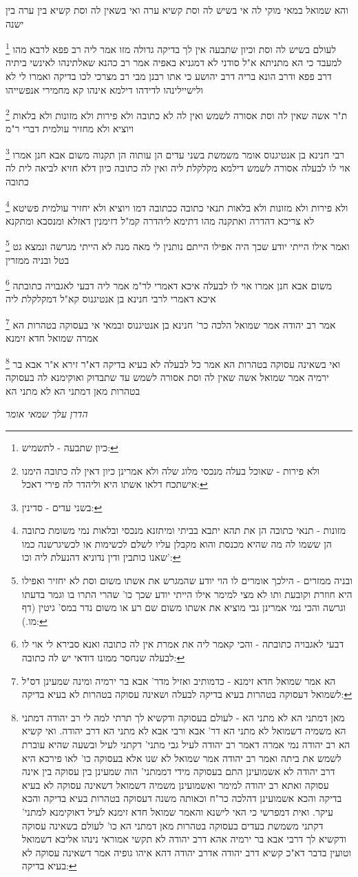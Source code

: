 \documentclass[12pt, openany]{book}
\newcommand{\footnotecomment}[1]{
	\renewcommand\thefootnote{}
	\footnote{#1}}
\newcommand{\commenta}[1]{\footnotecomment{#1}}
\begin{document}
{{והא שמואל במאי מוקי לה אי בשיש לה וסת קשיא ערה ואי בשאין לה וסת קשיא בין ערה בין ישנה 
\commenta{כיון שתבעה - לתשמיש:}
לעולם בשיש לה וסת וכיון שתבעה אין לך בדיקה גדולה מזו אמר ליה רב פפא לרבא מהו למעבד כי הא מתניתא
א"ל סודני לא דמגניא באפיה אמר רב כהנא שאלתינהו לאינשי ביתיה דרב פפא ודרב הונא בריה דרב יהושע כי אתו רבנן מבי רב מצרכי לכו בדיקה ואמרו לי לא ולישיילינהו לדידהו דילמא אינהו קא מחמירי אנפשייהו 
\commenta{ולא פירות - שאוכל בעלה מנכסי מלוג שלה ולא אמרינן כיון דאין לה כתובה הימנו אישתכח דלאו אשתו היא וליהדר לה פירי דאכל:}
ת"ר אשה שאין לה וסת אסורה לשמש ואין לה לא כתובה ולא פירות ולא מזונות ולא בלאות ויוציא ולא מחזיר עולמית דברי ר"מ 
\commenta{בשני עדים - סדינין:}
רבי חנינא בן אנטיגנוס אומר משמשת בשני עדים הן עותוה הן תקנוה משום אבא חנן אמרו אוי לו לבעלה 
אסורה לשמש דילמא מקלקלת ליה ואין לה כתובה כיון דלא חזיא לביאה לית לה כתובה
\commenta{מזונות - תנאי כתובה הן את תהא יתבא בביתי ומיתזנא מנכסי ובלאות נמי משומת כתובה הן ששמו לה מה שהיא מכנסת והוא מקבלן עליו לשלם לכשימות או לכשיגרשנה כמו שאנו כותבין ודין נדוניא דהנעלת ליה וכו':}
ולא פירות ולא מזונות ולא בלאות תנאי כתובה ככתובה דמו 
ויוציא ולא יחזיר עולמית פשיטא לא צריכא דהדרה ואתקנה מהו דתימא ליהדרה קמ"ל דזימנין דאזלא ומנסבא ומתקנא
\commenta{ובניה ממזרים - הילכך אומרים לו הוי יודע שהמגרש את אשתו משום וסת לא יחזיר ואפילו היא חוזרת וקובעת ותו לא מצי למימר אילו הייתי יודע שכך כו' שהרי התרו בו וגמר בדעתו וגרשה והכי נמי אמרינן גבי מוציא את אשתו משום שם רע או משום נדר במס' גיטין (דף מו.):}
ואמר אילו הייתי יודע שכך היה אפילו הייתם נותנין לי מאה מנה לא הייתי מגרשה ונמצא גט בטל ובניה ממזרין 
\commenta{דבעי לאגבויה כתובתה - והכי קאמר ליה את אמרת אין לה כתובה ואנא סבירא לי אוי לו לבעלה שנחסר ממונו דודאי יש לה כתובה:}
משום אבא חנן אמרו אוי לו לבעלה איכא דאמרי לר"מ אמר ליה דבעי לאגבויה כתובתה איכא דאמרי לרבי חנינא בן אנטיגנוס קא"ל דמקלקלת ליה 
\commenta{הא אמר שמואל חדא זימנא - כדמותיב ואזיל מדר' אבא בר ירמיה ומינה שמעינן דס"ל לשמואל דעסוקה בטהרות בעיא בדיקה לבעלה ושאינה עסוקה בטהרות לא בעיא בדיקה:}
אמר רב יהודה אמר שמואל הלכה כר' חנינא בן אנטיגנוס ובמאי אי בעסוקה בטהרות הא אמרה שמואל חדא זימנא 
\commenta{מאן דמתני הא לא מתני הא - לעולם בעסוקה ודקשיא לך תרתי למה לי רב יהודה דמתני הא משמיה דשמואל לא מתני הא דר' אבא ורבי אבא לא מתני הא דרב יהודה. ואי קשיא הא רב יהודה נמי אמרה דאמר רב יהודה לעיל גבי מתני' דקתני לעיל ובשעה שהיא עוברת לשמש את ביתה ואמר רב יהודה אמר שמואל לא שנו אלא בעסוקה כו' לאו פירכא היא דרב יהודה לא אשמועינן התם בעסוקה מידי דממתני' הוה שמעינן בין עסוקה בין אינה עסוקה ואתא רב יהודה למימר ואשמועינן משמיה דשמואל דשאינה עסוקה לא בעיא בדיקה והכא אשמועינן דהלכה כר"ח וכאותה משנה דעסוקה בטהרות בעיא בדיקה והכא עיקר. ואית דמפרשי כי האי לישנא והאמר שמואל חדא זימנא לעיל דאוקימנא למתני' דקתני משמשת בעדים בעסוקה בטהרות מאן דמתני הא כו' לעולם בשאינה עסוקה ודקשיא לך דרבי אבא בר ירמיה אהא דרב יהודה לא תקשי אמוראי נינהו אליבא דשמואל וטועין בדבר דא"כ קשיא דרב יהודה אדרב יהודה דהא איהו גופיה אמר דשאינה עסוקה לא בעיא בדיקה: }
ואי בשאינה עסוקה בטהרות הא אמר כל לבעלה לא בעיא בדיקה דא"ר זירא א"ר אבא בר ירמיה אמר שמואל אשה שאין לה וסת אסורה לשמש עד שתבדוק ואוקימנא לה בעסוקה בטהרות מאן דמתני הא לא מתני הא
\par \par {\large\emph{הדרן עלך שמאי אומר}}\par \par }

}
\end{document}
